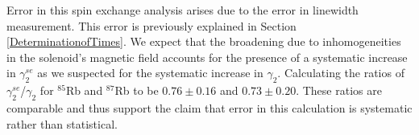 Error in this spin exchange analysis arises due to the error in linewidth measurement.  This error is previously explained in Section \ref{DeterminationofTimes}.   We expect that the broadening due to inhomogeneities in the solenoid's magnetic field accounts for the presence of a systematic increase in $\gamma^{se}_2$ as we suspected for the systematic increase in $\gamma_2$.  Calculating the ratios of $\gamma^{se}_2$/$\gamma_2$ for $^{85}$Rb and $^{87}$Rb to be $0.76\pm 0.16$ and $0.73\pm 0.20$.  These ratios are comparable and thus support the claim that error in this calculation is systematic rather than statistical.